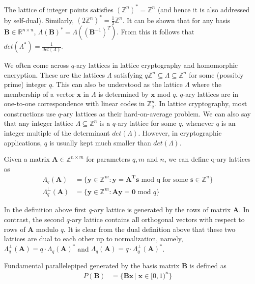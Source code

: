 The lattice of integer points satisfies $(\mathbb{Z}^n)^* = \mathbb{Z}^n$ (and hence it is also addressed by self-dual).
Similarly, $(2\mathbb{Z}^n)^* =\frac{1}{2}\mathbb{Z}^n$.
It can be shown that for any basis $\pmb{B} \in \mathbb{R}^{n\times n}$, $\Lambda(\pmb{B})^{*} = \Lambda((\pmb{B}^{-1})^T)$.
From this it follows that $det(\Lambda^{*}) = \frac{1}{det(\Lambda)}$.


We often come across $q$-ary lattices in lattice cryptography and homomorphic encryption.
These are the lattices $\Lambda$ satisfying $q\mathbb{Z}^n \subseteq \Lambda \subseteq \mathbb{Z}^n$ for some (possibly prime) integer $q$.
This can also be understood as the lattice $\Lambda$ where the membership of a vector $\boldsymbol{x}$ in $\Lambda$ is determined by $\boldsymbol{x}$ mod $q$.
$q$-ary lattices are in one-to-one correspondence with linear codes in $\mathbb{Z}^n_q$.
In lattice cryptography, most constructions use $q$-ary lattices as their hard-on-average problem.
We can also say that any integer lattice $\Lambda \subseteq \mathbb{Z}^n$ is a $q$-ary lattice for some $q$, whenever $q$ is an integer multiple of the determinant $det(\Lambda)$.
However, in cryptographic applications, $q$ is usually kept much smaller than $det(\Lambda)$.

Given a matrix $\pmb{A} \in \mathbb{Z}^{n\times m}$ for parameters $q,m$ and $n$, we can define q-ary lattices as
\begin{align*}
    \Lambda_q(\pmb{A})         & = \{\pmb{y} \in \mathbb{Z}^m : \pmb{y = A^Ts} \text{ mod q for some } \pmb{s} \in \mathbb{Z}^n \} \\
    \Lambda^{\perp}_q(\pmb{A}) & = \{\pmb{y} \in \mathbb{Z}^m : \pmb{Ay = 0} \text{ mod }q \}
\end{align*}

In the definition above first $q$-ary lattice is generated by the rows of matrix $\pmb{A}$. In contrast, the second $q$-ary lattice contains all orthogonal vectors with respect to rows of $\pmb{A}$ modulo $q$.
It is clear from the dual definition above that these two lattices are dual to each other up to normalization, namely,
$\Lambda^{\perp}_q(\pmb{A}) = q \cdot \Lambda_q(\pmb{A})^{*}$ and
$\Lambda_q(\pmb{A}) = q \cdot \Lambda^{\perp}_q(\pmb{A})^{*}$.


Fundamental parallelepiped generated by the basis matrix $\pmb{B}$ is defined as
\begin{align*}
    P(\pmb{B}) & =\{\pmb{Bx} \ | \ \pmb{x} \in [0,1)^n\}
\end{align*}

